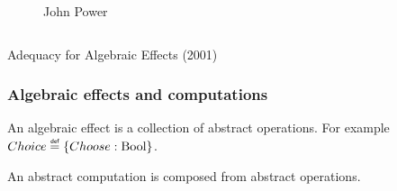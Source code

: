\begin{frame}
\begin{columns}
\begin{column}{0.5\textwidth}
\begin{center}
\begin{figure}
          \caption{John Power}
        \end{figure}
      \end{center}
    \end{column}
  \end{columns}
  \begin{center}
    Adequacy for Algebraic Effects (2001)
  \end{center}
\end{frame}

\begin{frame}
  \frametitle{Algebraic effects and computations}
  \begin{definition}
    An algebraic effect is a collection of abstract operations. 
    For example $Choice \defas \{ Choose : \text{Bool} \}$.
  \end{definition}
  \begin{definition}
    An abstract computation is composed from abstract operations.
  \end{definition}

\end{frame}

